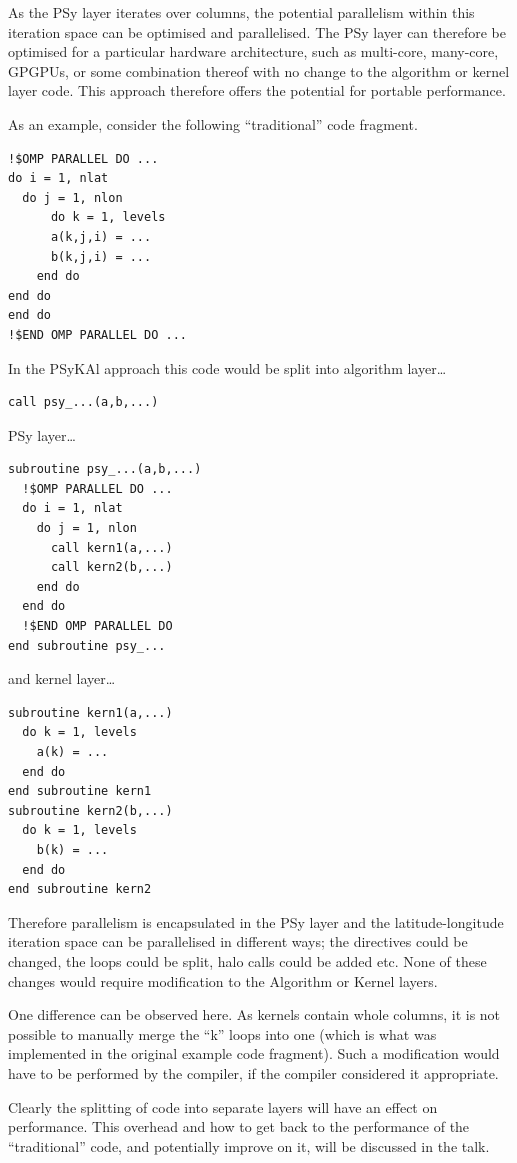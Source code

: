 \documentclass{IOS-Book-Article}
\begin{document}
As the PSy layer iterates over columns, the potential parallelism
within this iteration space can be optimised and parallelised. The PSy
layer can therefore be optimised for a particular hardware
architecture, such as multi-core, many-core, GPGPUs, or some
combination thereof with no change to the algorithm or kernel layer
code. This approach therefore offers the potential for portable
performance.

As an example, consider the following ``traditional'' code fragment.
\begin{verbatim}
!$OMP PARALLEL DO ...
do i = 1, nlat
  do j = 1, nlon
      do k = 1, levels
      a(k,j,i) = ...
      b(k,j,i) = ...
    end do
end do
end do
!$END OMP PARALLEL DO ...
\end{verbatim}
In the PSyKAl approach this code would be split into algorithm layer\ldots
\begin{verbatim}
call psy_...(a,b,...)
\end{verbatim}
PSy layer\ldots
\begin{verbatim}
subroutine psy_...(a,b,...)
  !$OMP PARALLEL DO ...
  do i = 1, nlat
    do j = 1, nlon
      call kern1(a,...)
      call kern2(b,...)
    end do
  end do
  !$END OMP PARALLEL DO
end subroutine psy_...
\end{verbatim}
and kernel layer\ldots
\begin{verbatim}
subroutine kern1(a,...)
  do k = 1, levels
    a(k) = ...
  end do
end subroutine kern1
subroutine kern2(b,...)
  do k = 1, levels
    b(k) = ...
  end do
end subroutine kern2
\end{verbatim}

Therefore parallelism is encapsulated in the PSy layer and the
latitude-longitude iteration space can be parallelised in different
ways; the directives could be changed, the loops could be split, halo
calls could be added etc. None of these changes would require
modification to the Algorithm or Kernel layers.

One difference can be observed here. As kernels contain whole columns,
it is not possible to manually merge the ``k'' loops into one (which is
what was implemented in the original example code fragment). Such a
modification would have to be performed by the compiler, if the
compiler considered it appropriate.

Clearly the splitting of code into separate layers will have an effect
on performance. This overhead and how to get back to the performance
of the ``traditional'' code, and potentially improve on it, will be
discussed in the talk.
\end{document}
